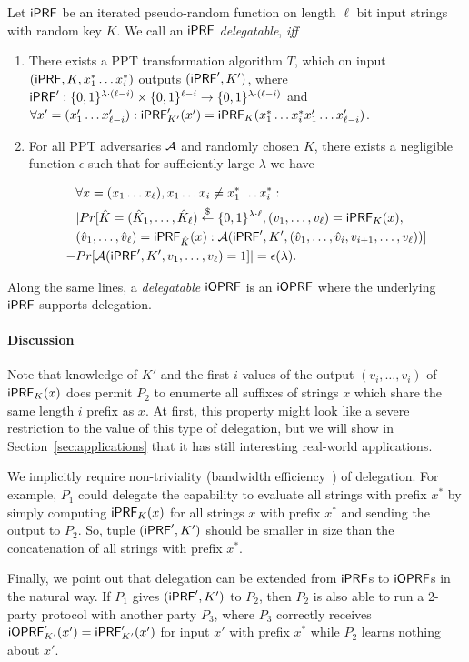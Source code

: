 \begin{definition} \label{def:del}
  Let $\mathsf{i}\mathsf{PRF}$ be an iterated pseudo-random function on length $\ell$
  bit input strings with random key $K$.  We call an $\mathsf{i}\mathsf{PRF}$
  \emph{delegatable}, \emph{iff}
  \begin{enumerate}
    \item
  There exists a PPT transformation
  algorithm $T$, which on input $(\mathsf{i}\mathsf{PRF},K,x^*_1\ldots{}x^*_i)$ outputs
  $(\mathsf{i}\mathsf{PRF}',K')$, where
  $\mathsf{i}\mathsf{PRF}':\{0,1\}^{\lambda\cdot(\ell-i)}\times\{0,1\}^{\ell-i}\rightarrow{}\{0,1\}^{\lambda\cdot(\ell-i)}$
  and
    $\forall{}x'=(x'_1\ldots{}x'_{\ell-i}):\mathsf{i}\mathsf{PRF}'_{K'}(x')=\mathsf{i}\mathsf{PRF}_{K}(x^*_1\ldots{}x^*_ix'_1\ldots{}x'_{\ell-i})$.
  \item For all PPT adversaries ${\mathcal{A}}$ and randomly chosen $K$,
    there exists a negligible function $\epsilon$ such that for
    sufficiently large $\lambda$ we have

    \begin{align*}
      &\forall{}x=(x_1\ldots{}x_\ell),x_1\ldots{}x_i\neq{}x^*_1\ldots{}x^*_i:\\&|Pr[\hat{K}=(\hat{K}_1,\ldots,\hat{K}_\ell)\stackrel{\$}{\leftarrow}\{0,1\}^{\lambda\cdot\ell},(v_1,\ldots,v_\ell)=\mathsf{i}\mathsf{PRF}_K(x),\\&(\hat{v}_1,\ldots,\hat{v}_\ell)=\mathsf{i}\mathsf{PRF}_{\hat{K}}(x):{\mathcal{A}}(\mathsf{i}\mathsf{PRF}',K',(\hat{v}_1,\ldots,\hat{v}_i,v_{i+1},\ldots,v_\ell))]\\-&Pr[{\mathcal{A}}(\mathsf{i}\mathsf{PRF}',K',v_1,\ldots,v_\ell)=1]|=\epsilon(\lambda).
\end{align*}
    \end{enumerate}
  \end{definition}

Along the same lines, a \emph{delegatable} $\mathsf{i}\mathsf{OPRF}$ is an $\mathsf{i}\mathsf{OPRF}$
where the underlying $\mathsf{i}\mathsf{PRF}$ supports delegation. 

\paragraph{Discussion}
Note that knowledge of $K'$ and the first $i$ values of the output
$(v_i,\ldots,v_i)$ of $\mathsf{i}\mathsf{PRF}_K(x)$ does permit $P_2$ to enumerte all
suffixes of strings $x$ which share the same length $i$ prefix as
$x$. At first, this property might look like a severe restriction to
the value of this type of delegation, but we will show in
Section~\ref{sec:applications} that it has still interesting
real-world applications.

We implicitly require non-triviality (bandwidth
efficiency~\cite{delegate}) of delegation. For example, $P_1$ could
delegate the capability to evaluate all strings with prefix $x^*$ by
simply computing $\mathsf{i}\mathsf{PRF}_K(x)$ for all strings $x$ with prefix $x^*$
and sending the output to $P_2$. So, tuple $(\mathsf{i}\mathsf{PRF}',K')$ should be
smaller in size than the concatenation of all strings with prefix
$x^*$.

Finally, we point out that delegation can be extended from $\mathsf{i}\mathsf{PRF}$s to
$\mathsf{i}\mathsf{OPRF}$s in the natural way. If $P_1$ gives $(\mathsf{i}\mathsf{PRF}',K')$ to $P_2$,
then $P_2$ is also able to run a 2-party protocol with another party
$P_3$, where $P_3$ correctly receives
$\mathsf{i}\mathsf{OPRF}'_{K'}(x')=\mathsf{i}\mathsf{PRF}'_{K'}(x')$ for input $x'$ with prefix $x^*$
while $P_2$ learns nothing about $x'$.



